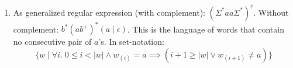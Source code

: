 \begin{exercise}{}
\begin{solution}
\begin{enumerate}
      \item 
        As generalized regular expression (with complement): \((\Sigma^* aa
        \Sigma^*)^c\). Without complement: \(b^*(ab^+)^*(a \mid \epsilon)\).
        This is the language of words that contain no consecutive pair of
        \(a\)'s. In set-notation:
        \begin{equation*}
          \{w \mid \forall i.\; 0 \leq i < |w| \land w_{(i)} = a \implies (i + 1 \geq |w| \lor w_{(i + 1)} \neq a)\}
        \end{equation*}
    \end{enumerate}
  \end{solution}

\end{exercise}





  

          
